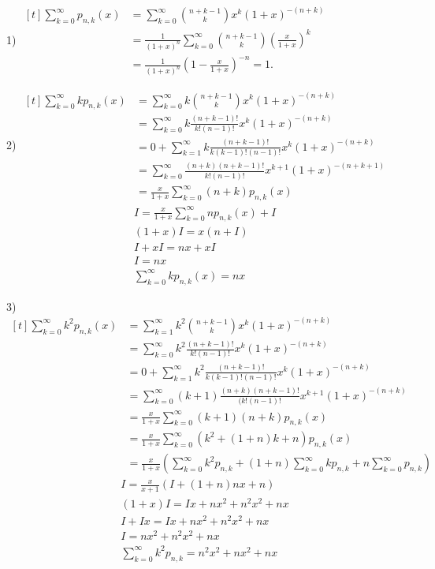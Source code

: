 \begin{english}
1)	$\begin{aligned}[t]
		\sum_{k=0}^{\infty} p_{n,k}(x) &= \sum_{k=0}^{\infty} \binom{n+k-1}{k} x^k (1+x)^{-(n+k)} \\
		&= \frac{1}{(1+x)^n} \sum_{k=0}^{\infty} \binom{n+k-1}{k} \left( \frac{x}{1+x} \right)^k \\
		&= \frac{1}{(1+x)^n} \left( 1 - \frac{x}{1+x} \right)^{-n} = 1.
	\end{aligned}$
\end{english}
	\newpage
\begin{english}
2)	$\begin{aligned}[t]
		\sum_{k=0}^{\infty} k p_{n,k}(x) &= \sum_{k=0}^{\infty} k \binom{n+k-1}{k} x^k (1+x)^{-(n+k)} \\
		&= \sum_{k=0}^{\infty} k \frac{(n+k-1)!}{k!(n-1)!} x^k (1+x)^{-(n+k)} \\
		&= 0 + \sum_{k=1}^{\infty} k \frac{(n+k-1)!}{k(k-1)!(n-1)!} x^k (1+x)^{-(n+k)} \\
		&= \sum_{k=0}^{\infty} \frac{(n+k)(n+k-1)!}{k!(n-1)!} x^{k+1} (1+x)^{-(n+k+1)} \\
		&= \frac{x}{1+x} \sum_{k=0}^{\infty} (n+k) p_{n,k}(x)
	\end{aligned}$
\begin{gather*}
	I = \frac{x}{1+x} \sum_{k=0}^{\infty} n p_{n,k}(x) + I\\
	(1+x) I = x(n+I)\\
	I + xI = nx + xI\\
	I = nx\\
	\sum_{k=0}^{\infty} k p_{n,k}(x) = nx
\end{gather*}
\end{english}
\newpage
\begin{english}
	3) $ 
	\begin{aligned}[t]
		\sum_{k=0}^{\infty} k^2 p_{n,k}(x) &= \sum_{k=1}^{\infty} k^2 \binom{n+k-1}{k} x^k (1+x)^{-(n+k)} \\
		&= \sum_{k=0}^{\infty} k^2 \frac{(n+k-1)!}{k!(n-1)!} x^k (1+x)^{-(n+k)} \\
		&= 0 + \sum_{k=1}^{\infty} k^2 \frac{(n+k-1)!}{k(k-1)!(n-1)!} x^k (1+x)^{-(n+k)} \\
		&= \sum_{k=0}^{\infty} (k+1) \frac{(n+k)(n+k-1)!}{(k!(n-1)!} x^{k+1} (1+x)^{-(n+k)} \\
		&= \frac{x}{1+x} \sum_{k=0}^{\infty} (k+1)(n+k) p_{n,k}(x)\\
		&= \frac{x}{1+x} \sum_{k=0}^{\infty} (k^2 + (1+n)k + n)p_{n,k}(x)\\
		&= \frac{x}{1+x} \left(
		\sum_{k=0}^{\infty} k^2 p_{n,k} 
		+ (1+n)\sum_{k=0}^{\infty} k p_{n,k} 
		+n\sum_{k=0}^{\infty} p_{n,k} 
		\right)
	\end{aligned}
	$
	\begin{gather*}
		I = \frac{x}{x+1} (I + (1+n)nx + n)\\
		(1+x) I = Ix + nx^2 + n^2x^2 + nx\\
		I + I x = Ix + nx^2 + n^2x^2 + nx\\
		I = nx^2 + n^2x^2 + nx\\
		\sum_{k=0}^{\infty}k^2 p_{n,k} = n^2 x^2 + nx^2 + nx
	\end{gather*}
\end{english}
\newcommand{\tL}{\tilde{L}}
